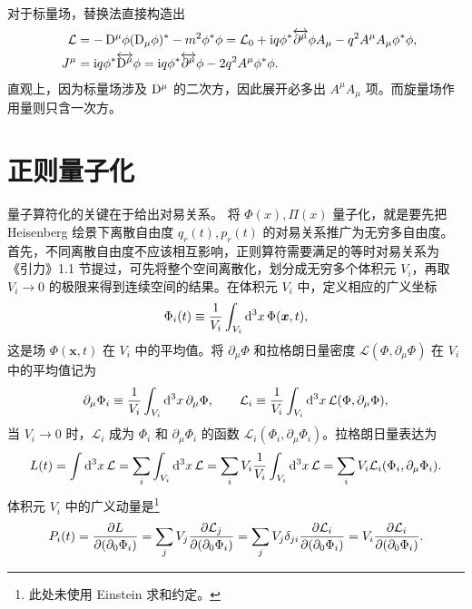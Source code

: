 对于标量场，替换法直接构造出
\begin{align*}
    \quad \Lag&=-\D^\mu\phi (\D_\mu \phi)^* - m^2\phi^*\phi = \Lag_0 + \i q \phi^*\overleftrightarrow{\p^\mu}\phi A_\mu - q^2 A^\mu A_\mu \phi^*\phi,\\
    J^\mu&= \i q \phi^*\overleftrightarrow{\D^\mu}\phi = \i q \phi^*\overleftrightarrow{\p^\mu}\phi - 2 q^2 A^\mu \phi^*\phi.
\end{align*}
直观上，因为标量场涉及 $\D^\mu$ 的二次方，因此展开必多出 $A^\mu A_\mu$ 项。而旋量场作用量则只含一次方。

\section{正则量子化}
量子算符化的关键在于给出对易关系。
将 $\Phi(x),\Pi(x)$ 量子化，就是要先把 Heisenberg 绘景下离散自由度 $q_r(t),p_r(t)$ 的对易关系推广为无穷多自由度。
首先，不同离散自由度不应该相互影响，正则算符需要满足的等时对易关系为
《引力》1.1 节提过，可先将整个空间离散化，划分成无穷多个体积元 $V_i$，再取 $V_i\to0$ 的极限来得到连续空间的结果。在体积元 $V_i$ 中，定义相应的广义坐标
\begin{equation}
  \Phi_i(t)\equiv \frac{1}{V_i}\int_{V_i}\dd^3x\,\Phi(\bm{x},t),
\end{equation}
这是场 $\Phi(\bm{x},t)$ 在 $V_i$ 中的平均值。将 $\partial_\mu\Phi$ 和拉格朗日量密度 $\mathcal{L}(\Phi,\partial_\mu\Phi)$ 在 $V_i$ 中的平均值记为
\begin{equation}
  \partial_\mu\Phi_i \equiv \frac{1}{V_i}\int_{V_i}\dd^3x\,\partial_\mu\Phi,
  \qquad
  \mathcal{L}_i \equiv \frac{1}{V_i}\int_{V_i}\dd^3x\,\mathcal{L}(\Phi,\partial_\mu\Phi),
\end{equation}
当 $V_i\to0$ 时，$\mathcal{L}_i$ 成为 $\Phi_i$ 和 $\partial_\mu\Phi_i$ 的函数 $\mathcal{L}_i(\Phi_i,\partial_\mu\Phi_i)$。拉格朗日量表达为
\[
  L(t)
   = \int\dd^3x\,\mathcal{L}
   = \sum_i\int_{V_i}\dd^3x\,\mathcal{L}
   = \sum_i V_i\frac{1}{V_i}\int_{V_i}\dd^3x\,\mathcal{L}
   = \sum_i V_i\mathcal{L}_i(\Phi_i,\partial_\mu\Phi_i).
\]
体积元 $V_i$ 中的广义动量是\footnote{此处未使用 Einstein 求和约定。}
\begin{equation}
  P_i(t)
  = \pdv{L}{(\partial_0\Phi_i)}
  = \sum_j V_j\pdv{\mathcal{L}_j}{(\partial_0\Phi_i)}
  = \sum_j V_j\delta_{ji}\pdv{\mathcal{L}_i}{(\partial_0\Phi_i)}
  = V_i\pdv{\mathcal{L}_i}{(\partial_0\Phi_i)}.
\end{equation}
